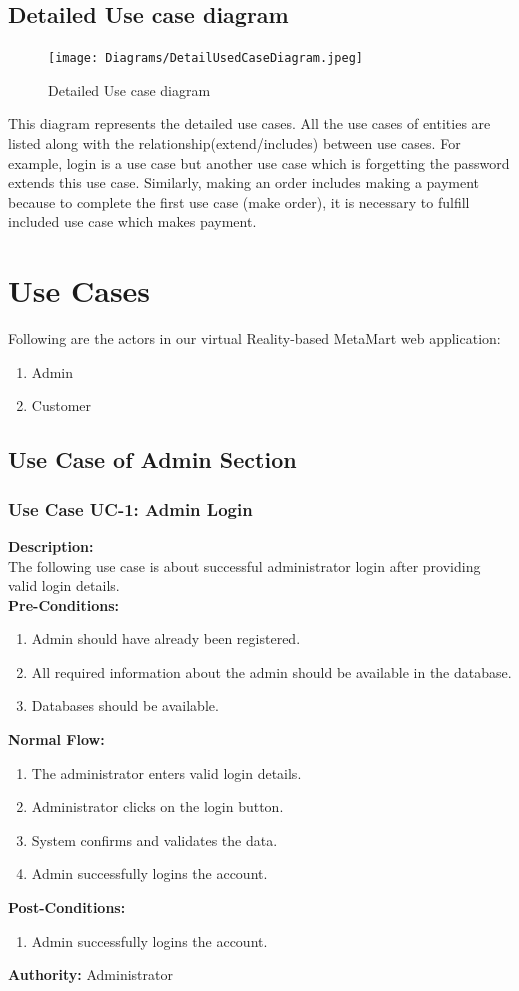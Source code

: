 \subsection{Detailed Use case diagram}
\begin{figure}[H]
    \centering
    \texttt{[image: Diagrams/DetailUsedCaseDiagram.jpeg]}
    \caption{Detailed Use case diagram}
    \label{fig: Detailed Use case diagram}
\end{figure}
\justifying
This diagram represents the detailed use cases. All the use cases of entities are listed along with the relationship(extend/includes) between use cases. For example, login is a use case but another use case which is forgetting the password extends this use case. Similarly, making an order includes making a payment because to complete the first use case (make order),  it is necessary to fulfill included use case which makes payment.
\section{Use Cases}
Following are the actors in our virtual Reality-based MetaMart web application:
\begin{enumerate}
    \item Admin
    \item Customer
\end{enumerate}
\subsection{Use Case of Admin Section}
\subsubsection{Use Case UC-1: Admin Login }
\textbf{Description:}\\
The following use case is about successful administrator login after providing valid login details.
\\
\textbf{Pre-Conditions:}
\begin{enumerate}
    \item Admin should have already been registered.
    \item  All required information about the admin should be available in the database.
    \item Databases should be available.
\end{enumerate}
\textbf{Normal Flow:}\\
\begin{enumerate}
\item The administrator enters valid login details.
\item Administrator clicks on the login button.
\item System confirms and validates the data. 
\item Admin successfully logins the account.
\end{enumerate}
\textbf{Post-Conditions: }
\begin{enumerate}
\item	Admin successfully logins the account. 
\end{enumerate}
\textbf{Authority:}
Administrator
